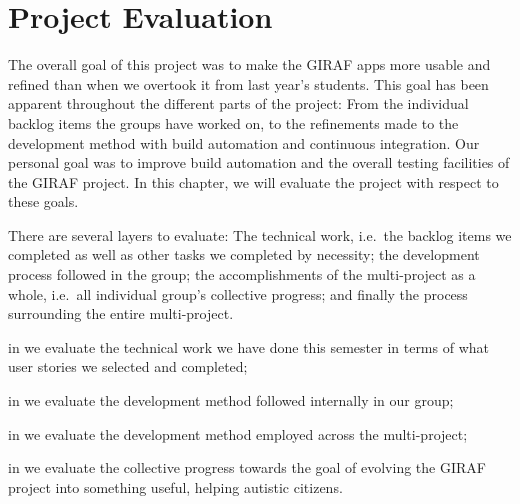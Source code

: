 \chapter{Project Evaluation}\label{chap:evaluation}
The overall goal of this project was to make the GIRAF apps more usable and refined than when we overtook it from last year's students. This goal has been apparent throughout the different parts of the project: From the individual backlog items the groups have worked on, to the refinements made to the development method with build automation and continuous integration. Our personal goal was to improve build automation and the overall testing facilities of the GIRAF project. In this chapter, we will evaluate the project with respect to these goals.

There are several layers to evaluate: The technical work, i.e.\ the backlog items we completed as well as other tasks we completed by necessity; the development process followed in the group; the accomplishments of the multi-project as a whole, i.e.\ all individual group's collective progress; and finally the process surrounding the entire multi-project.

\begin{chapterorganization}
  \item in  we evaluate the technical work we have done this semester in terms of what user stories we selected and completed;
  \item in  we evaluate the development method followed internally in our group;
  \item in  we evaluate the development method employed across the multi-project;
  \item in  we evaluate the collective progress towards the goal of evolving the GIRAF project into something useful, helping autistic citizens.
\end{chapterorganization}


